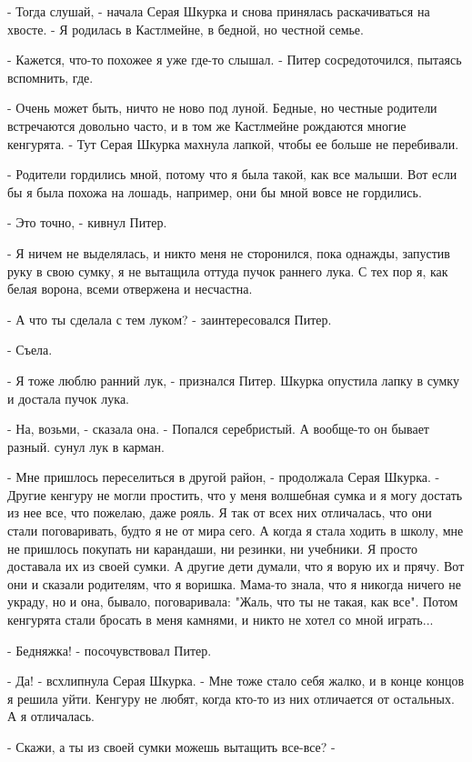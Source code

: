 \par- Тогда слушай, - начала Серая Шкурка и снова принялась 
раскачиваться на хвосте. - Я родилась в Кастлмейне, в бедной, но 
честной семье.
\par- Кажется, что-то похожее я уже где-то слышал. - Питер 
сосредоточился, пытаясь вспомнить, где.
\par- Очень может быть, ничто не ново под луной. Бедные, но честные 
родители встречаются довольно часто, и в том же Кастлмейне рождаются 
многие кенгурята. - Тут Серая Шкурка махнула лапкой, чтобы ее больше 
не перебивали.
\par- Родители гордились мной, потому что я была такой, как все 
малыши. Вот если бы я была похожа на лошадь, например, они бы мной 
вовсе не гордились.
\par- Это точно, - кивнул Питер.
\par- Я ничем не выделялась, и никто меня не сторонился, пока однажды, 
запустив руку в свою сумку, я не вытащила оттуда пучок раннего лука. С 
тех пор я, как белая ворона, всеми отвержена и несчастна.
\par- А что ты сделала с тем луком? - заинтересовался Питер.
\par- Съела.
\par- Я тоже люблю ранний лук, - признался Питер.
 Шкурка опустила лапку в сумку и достала пучок лука.
\par- На, возьми, - сказала она. - Попался серебристый. А вообще-то он 
бывает разный.
 сунул лук в карман.
\par- Мне пришлось переселиться в другой район, - продолжала Серая 
Шкурка. - Другие кенгуру не могли простить, что у меня волшебная сумка 
и я могу достать из нее все, что пожелаю, даже рояль. Я так от всех 
них отличалась, что они стали поговаривать, будто я не от мира сего. А 
когда я стала ходить в школу, мне не пришлось покупать ни карандаши, 
ни резинки, ни учебники. Я просто доставала их из своей сумки. А 
другие дети думали, что я ворую их и прячу. Вот они и сказали 
родителям, что я воришка. Мама-то знала, что я никогда ничего не 
украду, но и она, бывало, поговаривала: "Жаль, что ты не такая, как 
все". Потом кенгурята стали бросать в меня камнями, и никто не хотел 
со мной играть...
\par- Бедняжка! - посочувствовал Питер.
\par- Да! - всхлипнула Серая Шкурка. - Мне тоже стало себя жалко, и в 
конце концов я решила уйти. Кенгуру не любят, когда кто-то из них 
отличается от остальных. А я отличалась.
\par- Скажи, а ты из своей сумки можешь вытащить все-все? - 
